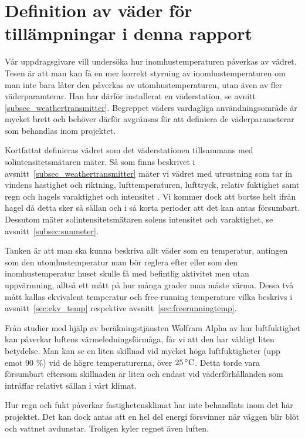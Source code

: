 \section{Definition av väder för tillämpningar i denna rapport}
\label{subsec_weather}
Vår uppdragsgivare vill undersöka hur inomhustemperaturen påverkas av vädret. Tesen är att man kan få en mer korrekt styrning av inomhustemperaturen om man inte bara låter den påverkas av utomhustemperaturen, utan även av fler väderparamterar. Han har därför installerat en väderstation, se avnitt~ \ref{subsec_weathertransmitter}.
Begreppet väders vardagliga användningsområde är mycket brett och behöver därför avgränsas för att definiera de väderparameterar som behandlas inom projektet.

Kortfattat definieras vädret som det väderstationen tillsammans med solintensitetsmätaren mäter. Så som finns beskrivet i avsnitt~\ref{subsec_weathertransmitter} mäter vi vädret med utrustning som tar in vindens hastighet och riktning, lufttemperaturen, lufttryck, relativ fuktighet samt regn och hagels varaktighet och intensitet \cite{datasheet_weathertransmitter}. Vi kommer dock att bortse helt ifrån hagel då detta sker så sällan och i så korta perioder att det kan antas försumbart.  Dessutom mäter solintensitetsmätaren solens intensitet och varaktighet, se avsnitt~\ref{subsec:sunmeter}. %

Tanken är att man ska kunna beskriva allt väder som en temperatur, antingen som den utomhustemperatur man bör reglera efter eller som den inomhustemperatur huset skulle få med befintlig aktivitet men utan uppvärmning, alltså ett mått på hur många grader man måste värma. Dessa två mått kallas ekvivalent temperatur och free-running temperature vilka beskrivs i avsnitt~\ref{sec:ekv_temp} respektive avsnitt~\ref{sec:freerunningtemp}. 

Från studier med hjälp av beräkningstjänsten Wolfram Alpha\cite{wolframalpha} av hur luftfuktighet kan påverkar luftens värmeledningsförmåga, får vi att den har väldigt liten betydelse. Man kan se en liten skillnad vid mycket höga luftfuktigheter (upp emot 90 \%) vid de högre temperaturerna, över $\unit[25]{^\circ C}$. Detta torde vara försumbart eftersom skillnaden är liten och endast vid väderförhållanden som inträffar relativt sällan i vårt klimat.

Hur regn och fukt påverkar fastighetensklimat har inte behandlats inom det här projektet.
Det kan dock antas att en hel del energi försvinner när väggen blir blöt och vattnet avdunstar. Troligen kyler regnet även luften.

